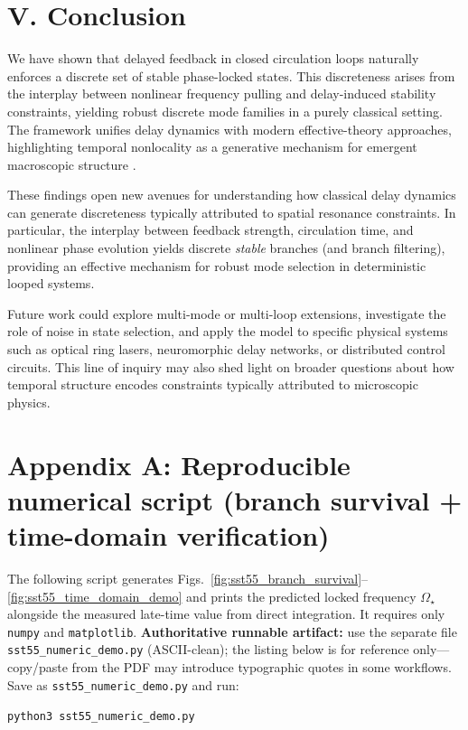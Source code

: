 \documentclass[11pt,a4paper]{article}
\begin{document}
\section*{V. Conclusion}
We have shown that delayed feedback in closed circulation loops naturally enforces a discrete set of stable phase-locked states. This discreteness arises from the interplay between nonlinear frequency pulling and delay-induced stability constraints, yielding robust discrete mode families in a purely classical setting. The framework unifies delay dynamics with modern effective-theory approaches, highlighting temporal nonlocality as a generative mechanism for emergent macroscopic structure \cite{Masoller2002}.


\medskip


\noindent

These findings open new avenues for understanding how classical delay dynamics can generate discreteness typically attributed to spatial resonance constraints. In particular, the interplay between feedback strength, circulation time, and nonlinear phase evolution yields discrete \emph{stable} branches (and branch filtering), providing an effective mechanism for robust mode selection in deterministic looped systems.


Future work could explore multi-mode or multi-loop extensions, investigate the role of noise in state selection, and apply the model to specific physical systems such as optical ring lasers, neuromorphic delay networks, or distributed control circuits. This line of inquiry may also shed light on broader questions about how temporal structure encodes constraints typically attributed to microscopic physics.




\section*{Appendix A: Reproducible numerical script (branch survival + time-domain verification)}
The following script generates Figs.~\ref{fig:sst55_branch_survival}--\ref{fig:sst55_time_domain_demo} and prints the predicted locked frequency $\Omega_\star$ alongside the measured late-time value from direct integration. It requires only \texttt{numpy} and \texttt{matplotlib}. \textbf{Authoritative runnable artifact:} use the separate file \texttt{sst55\_numeric\_demo.py} (ASCII-clean); the listing below is for reference only---copy/paste from the PDF may introduce typographic quotes in some workflows. Save as \texttt{sst55\_numeric\_demo.py} and run:
\begin{center}
\texttt{python3 sst55\_numeric\_demo.py}
\end{center}
\end{document}
